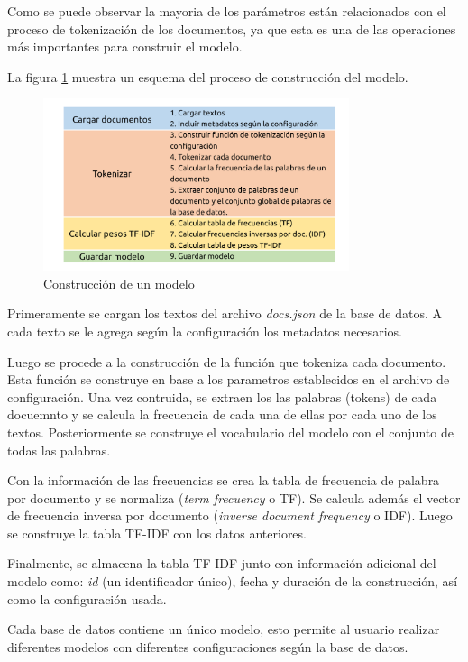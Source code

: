 Como se puede observar la mayoria de los parámetros están relacionados
con el proceso de tokenización de los documentos, ya que esta es una de las
operaciones más importantes para construir el modelo.

La figura \ref{fig:model-build} muestra un esquema del proceso de construcción del
modelo.

\begin{figure}[htb]%
	\begin{center}
		\includegraphics[width=0.8\textwidth]{./sri_02.png}
	\end{center}
	\caption{Construcción de un modelo}
	\label{fig:model-build}
\end{figure}

Primeramente se cargan los textos del archivo \emph{docs.json} de la base de
datos. A cada texto se le agrega según la configuración los metadatos necesarios.

Luego se procede a la construcción de la función que tokeniza cada documento.
Esta función se construye en base a los parametros establecidos en el archivo
de configuración. Una vez contruida, se extraen los las palabras (tokens) de
cada docuemnto y se calcula la frecuencia de cada una de ellas por cada uno de
los textos. Posteriormente se construye el vocabulario del modelo con el
conjunto de todas las palabras.

Con la información de las frecuencias se crea la tabla de frecuencia de palabra
por documento y se normaliza (\emph{term frecuency} o TF). Se calcula además el
vector de frecuencia inversa por documento (\emph{inverse document frequency} o
IDF). Luego se construye la tabla TF-IDF con los datos anteriores.

Finalmente, se almacena la tabla TF-IDF junto con información adicional del modelo
como: \emph{id} (un identificador único), fecha y duración de la construcción, así
como la configuración usada.

Cada base de datos contiene un único modelo, esto permite al usuario realizar
diferentes modelos con diferentes configuraciones según la base de datos.


